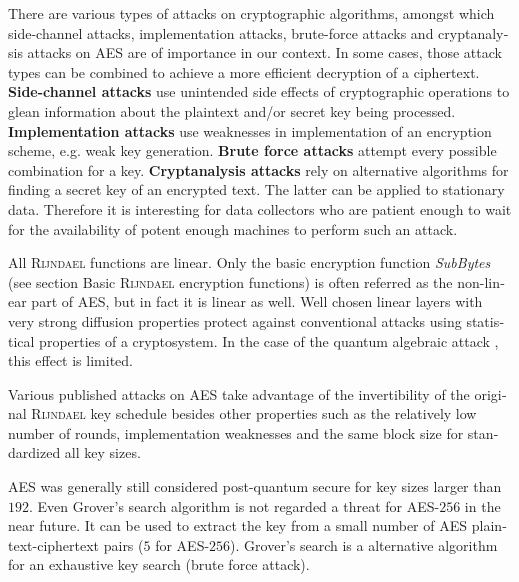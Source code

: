 \documentclass[a4paper,11pt]{article}
\begin{document}
\begin{otherlanguage}{english}
\begin{multicols}{2}
\vspace{0.1cm}

\noindent
There are various types of attacks on cryptographic algorithms, amongst which side-channel attacks, implementation attacks, brute-force attacks and cryptanalysis attacks on \textsc{AES} are of importance in our context. In some cases, those attack types can be combined to achieve a more efficient decryption of a ciphertext.\\

\noindent
\textbf{Side-channel attacks} use unintended side effects of cryptographic operations to glean information about the plaintext and/or secret key being processed. \textbf{Implementation attacks} use weaknesses in implementation of an encryption scheme, e.g. weak key generation. \textbf{Brute force attacks} attempt every possible combination for a key. \textbf{Cryptanalysis attacks} rely on alternative algorithms for finding a secret key of an encrypted text. The latter can be applied to stationary data. Therefore it is interesting for data collectors who are patient enough to wait for the availability of potent enough machines to perform such an attack.

\noindent
All \textsc{Rijndael} functions are linear. Only the basic encryption function \textit{SubBytes} (see section Basic \textsc{Rijndael} encryption functions) is often referred as the non-linear part of \textsc{AES}, but in fact it is linear as well. Well chosen linear layers with very strong diffusion properties protect against conventional attacks using statistical properties of a cryptosystem. In the case of the quantum algebraic attack \cite{QAA}, this effect is limited.

\noindent
Various published attacks on \textsc{AES} \cite{HFE, WEI, CRK} take advantage of the invertibility of the original \textsc{Rijndael} key schedule besides other properties such as the relatively low number of rounds, implementation weaknesses and the same block size for standardized all key sizes.

\noindent
\textsc{AES} was generally still considered post-quantum secure for key sizes larger than $192$. Even Grover’s search algorithm \cite{GRV} is not regarded a threat for \textsc{AES}-$256$ in the near future. It can be used to extract the key from a small number of \textsc{AES} plaintext-ciphertext pairs ($5$ for \textsc{AES}-$256$). Grover's search is a alternative algorithm for an exhaustive key search (brute force attack).


\end{multicols}
\end{otherlanguage}
\end{document}
